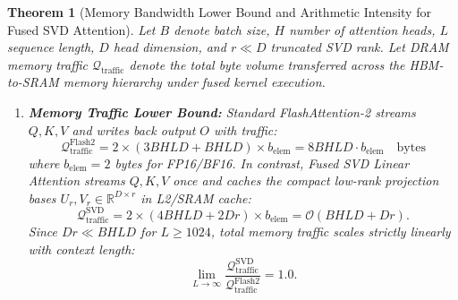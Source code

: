 \documentclass[10pt,journal,compsoc]{IEEEtran}
\newtheorem{theorem}{Theorem}
\begin{document}
\begin{theorem}[Memory Bandwidth Lower Bound and Arithmetic Intensity for Fused SVD Attention]
Let $B$ denote batch size, $H$ number of attention heads, $L$ sequence length, $D$ head dimension, and $r \ll D$ truncated SVD rank.
Let DRAM memory traffic $\mathcal{Q}_{\text{traffic}}$ denote the total byte volume transferred across the HBM-to-SRAM memory hierarchy under fused kernel execution.

\begin{enumerate}
    \item \textbf{Memory Traffic Lower Bound:} Standard FlashAttention-2 streams $Q, K, V$ and writes back output $O$ with traffic:
    \begin{equation}
    \mathcal{Q}_{\text{traffic}}^{\text{Flash2}} = 2 \times (3 B H L D + B H L D) \times b_{\text{elem}} = 8 B H L D \cdot b_{\text{elem}} \quad \text{bytes}
    \end{equation}
    where $b_{\text{elem}} = 2$ bytes for FP16/BF16.
    In contrast, Fused SVD Linear Attention streams $Q, K, V$ once and caches the compact low-rank projection bases $U_r, V_r \in \mathbb{R}^{D \times r}$ in L2/SRAM cache:
    \begin{equation}
    \mathcal{Q}_{\text{traffic}}^{\text{SVD}} = 2 \times (4 B H L D + 2 D r) \times b_{\text{elem}} = \mathcal{O}(B H L D + D r).
    \end{equation}
    Since $D r \ll B H L D$ for $L \ge 1024$, total memory traffic scales strictly linearly with context length:
    \begin{equation}
    \lim_{L \to \infty} \frac{\mathcal{Q}_{\text{traffic}}^{\text{SVD}}}{\mathcal{Q}_{\text{traffic}}^{\text{Flash2}}} = 1.0.
    \end{equation}


\end{enumerate}
\end{theorem}
\end{document}
